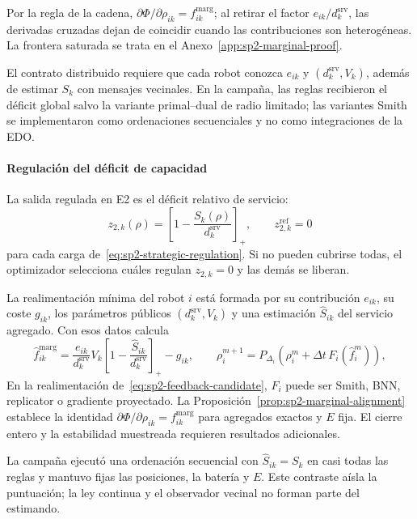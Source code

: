 Por la regla de la cadena, $\partial\Phi/\partial\rho_{ik}=f_{ik}^{\mathrm{marg}}$; al retirar el factor $e_{ik}/d_k^{\mathrm{srv}}$, las derivadas cruzadas dejan de coincidir cuando las contribuciones son heterogéneas. La frontera saturada se trata en el Anexo~\ref{app:sp2-marginal-proof}.

El contrato distribuido requiere que cada robot conozca $e_{ik}$ y $(d_k^{\mathrm{srv}},V_k)$, además de estimar $S_k$ con mensajes vecinales. En la campaña, las reglas recibieron el déficit global salvo la variante primal--dual de radio limitado; las variantes Smith se implementaron como ordenaciones secuenciales y no como integraciones de la EDO.

\paragraph{Regulación del déficit de capacidad}

La salida regulada en E2 es el déficit relativo de servicio:
\begin{equation}
 z_{2,k}(\rho)=
 \left[1-\frac{S_k(\rho)}{d_k^{\mathrm{srv}}}\right]_+,
 \qquad z_{2,k}^{\mathrm{ref}}=0
 \label{eq:sp2-strategic-regulation}
\end{equation}
para cada carga de~\eqref{eq:sp2-strategic-regulation}. Si no pueden cubrirse todas, el optimizador selecciona cuáles regulan $z_{2,k}=0$ y las demás se liberan.

La realimentación mínima del robot $i$ está formada por su contribución $e_{ik}$, su coste $g_{ik}$, los parámetros públicos $(d_k^{\mathrm{srv}},V_k)$ y una estimación $\widehat S_{ik}$ del servicio agregado. Con esos datos calcula
\begin{equation}
 \widehat f_{ik}^{\mathrm{marg}}
 =\frac{e_{ik}}{d_k^{\mathrm{srv}}}V_k
  \left[1-\frac{\widehat S_{ik}}{d_k^{\mathrm{srv}}}\right]_+-g_{ik},
 \qquad
 \rho_i^{m+1}=P_{\Delta_i}\!\left(
 \rho_i^m+\Delta t\,F_i(\widehat f_i^m)\right),
 \label{eq:sp2-feedback-candidate}
\end{equation}
En la realimentación de~\eqref{eq:sp2-feedback-candidate}, $F_i$ puede ser Smith, BNN, replicator o gradiente proyectado. La Proposición~\ref{prop:sp2-marginal-alignment} establece la identidad $\partial\Phi/\partial\rho_{ik}=f_{ik}^{\mathrm{marg}}$ para agregados exactos y $E$ fija. El cierre entero y la estabilidad muestreada requieren resultados adicionales.

La campaña ejecutó una ordenación secuencial con $\widehat S_{ik}=S_k$ en casi todas las reglas y mantuvo fijas las posiciones, la batería y $E$. Este contraste aísla la puntuación; la ley continua y el observador vecinal no forman parte del estimando.
